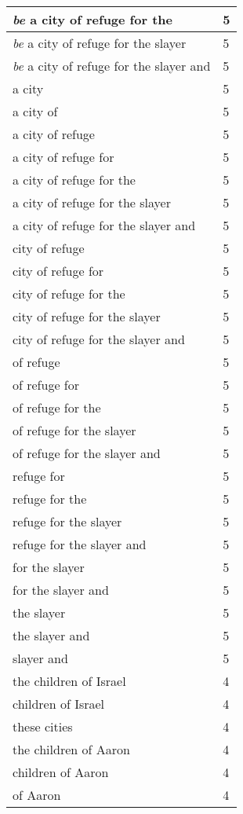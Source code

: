 \begin{center}
\begin{longtable}{|p{3.0in}|p{0.5in}|}
\emph{be} a city of refuge for the & 5\\ \hline 
\emph{be} a city of refuge for the slayer & 5\\ \hline 
\emph{be} a city of refuge for the slayer and & 5\\ \hline 
a city & 5\\ \hline 
a city of & 5\\ \hline 
a city of refuge & 5\\ \hline 
a city of refuge for & 5\\ \hline 
a city of refuge for the & 5\\ \hline 
a city of refuge for the slayer & 5\\ \hline 
a city of refuge for the slayer and & 5\\ \hline 
city of refuge & 5\\ \hline 
city of refuge for & 5\\ \hline 
city of refuge for the & 5\\ \hline 
city of refuge for the slayer & 5\\ \hline 
city of refuge for the slayer and & 5\\ \hline 
of refuge & 5\\ \hline 
of refuge for & 5\\ \hline 
of refuge for the & 5\\ \hline 
of refuge for the slayer & 5\\ \hline 
of refuge for the slayer and & 5\\ \hline 
refuge for & 5\\ \hline 
refuge for the & 5\\ \hline 
refuge for the slayer & 5\\ \hline 
refuge for the slayer and & 5\\ \hline 
for the slayer & 5\\ \hline 
for the slayer and & 5\\ \hline 
the slayer & 5\\ \hline 
the slayer and & 5\\ \hline 
slayer and & 5\\ \hline 
the children of Israel & 4\\ \hline 
children of Israel & 4\\ \hline 
these cities & 4\\ \hline 
the children of Aaron & 4\\ \hline 
children of Aaron & 4\\ \hline 
of Aaron & 4\\ \hline 

\end{longtable}
\end{center}
